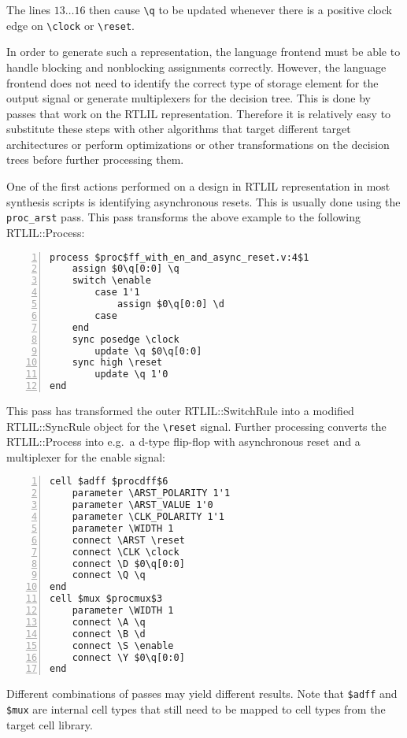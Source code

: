 The lines $13 \dots 16$  then cause {\tt \textbackslash{}q} to be updated whenever there is
a positive clock edge on {\tt \textbackslash{}clock} or {\tt \textbackslash{}reset}.

In order to generate such a representation, the language frontend must be able to handle blocking
and nonblocking assignments correctly. However, the language frontend does not need to identify
the correct type of storage element for the output signal or generate multiplexers for the
decision tree. This is done by passes that work on the RTLIL representation. Therefore it is
relatively easy to substitute these steps with other algorithms that target different target
architectures or perform optimizations or other transformations on the decision trees before
further processing them.

One of the first actions performed on a design in RTLIL representation in most
synthesis scripts is identifying asynchronous resets. This is usually done using the {\tt proc\_arst}
pass. This pass transforms the above example to the following RTLIL::Process:

\begin{lstlisting}[numbers=left,frame=single,language=rtlil]
process $proc$ff_with_en_and_async_reset.v:4$1
	assign $0\q[0:0] \q
	switch \enable
		case 1'1
			assign $0\q[0:0] \d
		case
	end
	sync posedge \clock
		update \q $0\q[0:0]
	sync high \reset
		update \q 1'0
end
\end{lstlisting}

This pass has transformed the outer RTLIL::SwitchRule into a modified RTLIL::SyncRule object
for the {\tt \textbackslash{}reset} signal. Further processing converts the RTLIL::Process
into e.g.~a d-type flip-flop with asynchronous reset and a multiplexer for the enable signal:

\begin{lstlisting}[numbers=left,frame=single,language=rtlil]
cell $adff $procdff$6
	parameter \ARST_POLARITY 1'1
	parameter \ARST_VALUE 1'0
	parameter \CLK_POLARITY 1'1
	parameter \WIDTH 1
	connect \ARST \reset
	connect \CLK \clock
	connect \D $0\q[0:0]
	connect \Q \q
end
cell $mux $procmux$3
	parameter \WIDTH 1
	connect \A \q
	connect \B \d
	connect \S \enable
	connect \Y $0\q[0:0]
end
\end{lstlisting}

Different combinations of passes may yield different results. Note that {\tt \$adff} and {\tt
\$mux} are internal cell types that still need to be mapped to cell types from the
target cell library.

